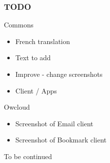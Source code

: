 \documentclass{beamer}
\begin{document}
\begin{frame}
\frametitle{TODO}

\begin{block}{Commons}
\begin{itemize}
\item French translation
\item Text to add
\item Improve - change screenshots
\item Client / Apps
\end{itemize}
\end{block}

\begin{block}{Owcloud}
\begin{itemize}
\item Screenshot of Email client
 \item Screenshot of Bookmark client
\end{itemize}
\end{block}
\end{frame}

\begin{frame}
\Huge{\centerline{To be continued}}
\end{frame}
\end{document}
